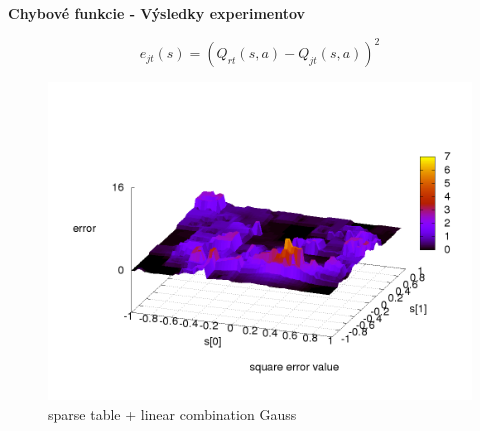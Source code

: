 \documentclass[xcolor=dvipsnames]{beamer}
\begin{document}
\begin{frame}{\bf Chybové funkcie - Výsledky experimentov}

\begin{equation}
e_{jt}(s) = (Q_{rt}(s,a) - Q_{jt}(s,a))^2  \nonumber
\end{equation}

\begin{minipage}{.5\textwidth}

\begin{figure}[!htb]
\centering
\includegraphics[scale=.2]{../../results_q_learning/map_2/function_type_3/q_learning_error.png}
\caption{sparse table + linear combination Gauss}
\end{figure}

\end{minipage}%
\begin{minipage}{.5\textwidth}


\end{minipage}
\end{frame}
\end{document}
